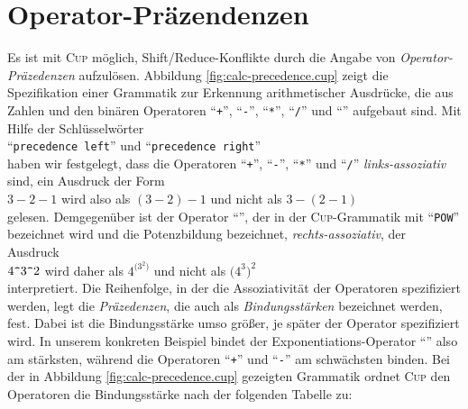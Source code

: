\section{Operator-Pr\"azendenzen \label{section:operator-precedence}}
Es ist mit   \textsc{Cup} m\"oglich, Shift/Reduce-Konflikte durch die Angabe von
\emph{Operator-Pr\"azedenzen} 
aufzul\"osen.  Abbildung \ref{fig:calc-precedence.cup} zeigt die Spezifikation einer Grammatik zur
Erkennung arithmetischer Ausdr\"ucke, die aus Zahlen und den bin\"aren Operatoren ``\texttt{+}'',
``\texttt{-}'', ``\texttt{*}'', ``\texttt{/}'' und ``\texttt{}'' aufgebaut sind.   Mit
Hilfe der Schl\"usselw\"orter 
\\[0.2cm]
\hspace*{1.3cm}
``\texttt{precedence left}'' \quad und \quad ``\texttt{precedence right}'' 
\\[0.2cm]
haben wir festgelegt, dass die Operatoren ``\texttt{+}'', ``\texttt{-}'', ``\texttt{*}'' und
``\texttt{/}'' \emph{links-assoziativ} sind, ein Ausdruck der Form 
\\[0.2cm]
\hspace*{1.3cm}
$3 - 2 - 1$ \quad wird also als \quad $(3 - 2) - 1$ \quad und nicht als \quad $3 - (2-1)$
\\[0.2cm]
gelesen.  Demgegen\"uber ist der Operator ``\texttt{}'', der in der \textsc{Cup}-Grammatik
mit ``\texttt{POW}'' bezeichnet wird und die Potenzbildung bezeichnet,
\emph{rechts-assoziativ}, der Ausdruck 
\\[0.2cm]
\hspace*{1.3cm}
$4 \texttt{\symbol{94}} 3 \texttt{\symbol{94}} 2$ \quad wird daher als \quad
$4^{\mbox{(}3^2\mbox{)}}$ \quad  und nicht als \quad $\bigl(4^3\bigr)^2$
\\[0.2cm]
interpretiert.   Die Reihenfolge, in der die Assoziativit\"at der Operatoren spezifiziert werden, legt die
\emph{Pr\"azedenzen}, die auch als \emph{Bindungsst\"arken} bezeichnet werden, fest.  Dabei ist die
Bindungsst\"arke umso gr\"o{\ss}er, je sp\"ater der Operator spezifiziert wird.  In unserem konkreten Beispiel bindet
der Exponentiations-Operator ``\texttt{}'' also am st\"arksten, w\"ahrend die Operatoren ``\texttt{+}'' und
``\texttt{-}'' am schw\"achsten binden.  Bei der in Abbildung \ref{fig:calc-precedence.cup} gezeigten Grammatik
ordnet \textsc{Cup} den Operatoren die Bindungsst\"arke nach der folgenden Tabelle zu:

